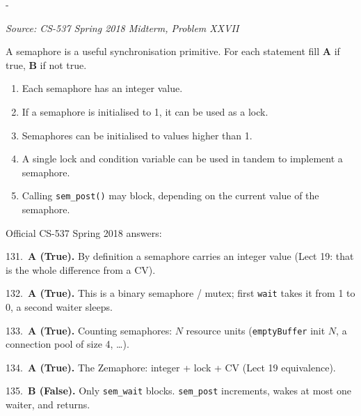 \documentclass[11pt,a4paper]{article}
\makeatletter
\newcommand{\keepspace}[1]{\par\penalty-100\begingroup
  \setlength{\dimen@}{#1}\dimen@ii\pagegoal\advance\dimen@ii-\pagetotal
  \ifdim\dimen@>\dimen@ii\ifdim\dimen@ii>\z@\vfil\fi\break\fi\endgroup}
\newcounter{qn}[section]
\newenvironment{Qn}[4]{%
  \refstepcounter{qn}\keepspace{7\baselineskip}%
  \begin{tcolorbox}[qboxstyle, title={Q\thesection.\theqn\ \ [#1 \textbar\ #2]\ \ #4}]%
  {\footnotesize\color{g3}\textit{Source: #3}}\par\smallskip%
}{%
  \end{tcolorbox}%
}
\newenvironment{Sol}{%
  \begin{tcolorbox}[sboxstyle, title={Solution}]%
}{%
  \end{tcolorbox}\vspace{0.35em}%
}
\makeatother
\begin{document}
\begin{Qn}{Easy-Medium}{Lect 19}{CS-537 Spring 2018 Midterm, Problem XXVII}{T/F: semaphore semantics}
A semaphore is a useful synchronisation primitive. For each statement fill
\textbf{A} if true, \textbf{B} if not true.

\begin{enumerate}
  \item[131.] Each semaphore has an integer value.
  \item[132.] If a semaphore is initialised to 1, it can be used as a lock.
  \item[133.] Semaphores can be initialised to values higher than 1.
  \item[134.] A single lock and condition variable can be used in tandem to
        implement a semaphore.
  \item[135.] Calling \texttt{sem\_post()} may block, depending on the
        current value of the semaphore.
\end{enumerate}
\end{Qn}
\begin{Sol}
Official CS-537 Spring 2018 answers:

131.~\textbf{A (True).} By definition a semaphore carries an integer
value (Lect 19: that is the whole difference from a CV).

132.~\textbf{A (True).} This is a binary semaphore / mutex; first
\texttt{wait} takes it from 1 to 0, a second waiter sleeps.

133.~\textbf{A (True).} Counting semaphores: $N$ resource units
(\texttt{emptyBuffer} init $N$, a connection pool of size 4, \ldots).

134.~\textbf{A (True).} The Zemaphore: integer + lock + CV (Lect 19
equivalence).

135.~\textbf{B (False).} Only \texttt{sem\_wait} blocks.
\texttt{sem\_post} increments, wakes at most one waiter, and returns.
\end{Sol}
\end{document}
